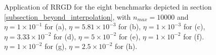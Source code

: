 \documentclass[article,authoryear,jmlmc]{beg_32}             %
\begin{document}


\begin{figure}[h!]
	\centering
        \scalebox{0.60}{}
	\caption{
          Application of RRGD for the eight benchmarks depicted in section \ref{subsection_beyond_interpolation}, with $n_{max}=10000$ and 
 $\eta = 1   \times 10^{-1}$  for \exOne    (a), 
 $\eta = 5.81\times 10^{-3}$  for \exTwo    (b), 
 $\eta = 1   \times 10^{-3}$  for \exThree  (c), 
 $\eta = 3.33\times 10^{-2}$  for \exFour   (d), 
 $\eta = 5   \times 10^{-2}$  for \exFive   (e), 
 $\eta = 1   \times 10^{-2}$  for \exSix    (f). 
 $\eta = 1   \times 10^{-2}$  for \exSeven  (g), 
 $\eta = 2.5 \times 10^{-2}$  for \exHeight (h). 
        }
	\label{SGD_exs}
\end{figure}
\end{document}
